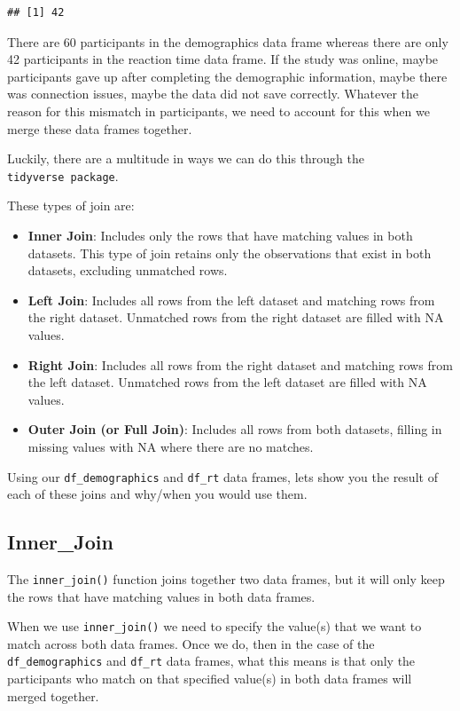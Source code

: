 \documentclass[
]{book}
\begin{document}
\begin{verbatim}
## [1] 42
\end{verbatim}

There are 60 participants in the demographics data frame whereas there are only 42 participants in the reaction time data frame. If the study was online, maybe participants gave up after completing the demographic information, maybe there was connection issues, maybe the data did not save correctly. Whatever the reason for this mismatch in participants, we need to account for this when we merge these data frames together.

Luckily, there are a multitude in ways we can do this through the \texttt{tidyverse\ package}.

These types of join are:

\begin{itemize}
\item
  \textbf{Inner Join}: Includes only the rows that have matching values in both datasets. This type of join retains only the observations that exist in both datasets, excluding unmatched rows.
\item
  \textbf{Left Join}: Includes all rows from the left dataset and matching rows from the right dataset. Unmatched rows from the right dataset are filled with NA values.
\item
  \textbf{Right Join}: Includes all rows from the right dataset and matching rows from the left dataset. Unmatched rows from the left dataset are filled with NA values.
\item
  \textbf{Outer Join (or Full Join)}: Includes all rows from both datasets, filling in missing values with NA where there are no matches.
\end{itemize}

Using our \texttt{df\_demographics} and \texttt{df\_rt} data frames, lets show you the result of each of these joins and why/when you would use them.

\subsection{Inner\_Join}\label{inner_join}

The \texttt{inner\_join()} function joins together two data frames, but it will only keep the rows that have matching values in both data frames.

When we use \texttt{inner\_join()} we need to specify the value(s) that we want to match across both data frames. Once we do, then in the case of the \texttt{df\_demographics} and \texttt{df\_rt} data frames, what this means is that only the participants who match on that specified value(s) in both data frames will merged together.
\end{document}
